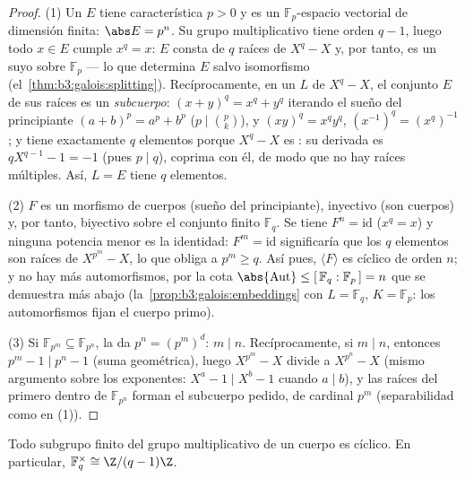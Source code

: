 \begin{proof}
(1) Un  $E$ tiene
característica $p > 0$ y es un $\mathbb F_p$-espacio vectorial de
dimensión finita: $\abs E = p^n$. Su grupo multiplicativo tiene orden
$q - 1$, luego todo $x \in E$ cumple $x^q = x$: $E$ consta de $q$ raíces
de $X^q - X$ y, por tanto, es un  suyo sobre $\mathbb F_p$ --- lo que determina $E$
salvo isomorfismo (el~\cref{thm:b3:galois:splitting}). Recíprocamente,
en un  $L$ de
$X^q - X$, el conjunto $E$ de sus raíces es un \emph{subcuerpo}:
$(x + y)^q = x^q + y^q$ iterando el sueño del principiante
$(a+b)^p = a^p + b^p$ ($p \mid \binom pk$), y $(xy)^q = x^qy^q$,
$(x^{-1})^q = (x^q)^{-1}$; y tiene exactamente $q$ elementos porque
$X^q - X$ es : su derivada es
$qX^{q-1} - 1 = -1$ (pues $p \mid q$), coprima con él, de modo que no
hay raíces múltiples. Así, $L = E$ tiene $q$ elementos.

(2) $F$ es un morfismo de cuerpos (sueño del principiante), inyectivo
(son cuerpos) y, por tanto, biyectivo sobre el conjunto finito
$\mathbb F_q$. Se tiene $F^n =
\mathrm{id}$ ($x^q = x$) y ninguna potencia menor es la identidad:
$F^m = \mathrm{id}$ significaría que los $q$ elementos son raíces de
$X^{p^m} - X$, lo que obliga a $p^m \geq q$. Así pues,
$\langle F\rangle$ es cíclico de orden $n$; y no hay más automorfismos,
por la cota $\abs{\operatorname{Aut}} \leq [\,\mathbb F_q :
\mathbb F_p\,] = n$ que se demuestra más abajo
(la~\cref{prop:b3:galois:embeddings} con $L = \mathbb F_q$, $K =
\mathbb F_p$: los automorfismos fijan el cuerpo primo).

(3) Si $\mathbb F_{p^m} \subseteq \mathbb F_{p^n}$, la
 da $p^n = (p^m)^d$:
$m \mid n$. Recíprocamente, si $m \mid n$, entonces
$p^m - 1 \mid p^n - 1$ (suma geométrica), luego $X^{p^m} - X$ divide a
$X^{p^n} - X$ (mismo argumento sobre los exponentes:
$X^{a} - 1 \mid X^{b}
- 1$ cuando $a \mid b$), y las raíces del primero dentro de
$\mathbb F_{p^n}$ forman el subcuerpo pedido, de cardinal $p^m$
(separabilidad como en (1)).
\end{proof}

\begin{theorem}[Ciclicidad]\label{thm:b3:galois:cyclic}
Todo subgrupo finito del grupo multiplicativo de un cuerpo es cíclico.
En particular, $\mathbb F_q^\times \cong
\Z/(q-1)\Z$.
\end{theorem}

